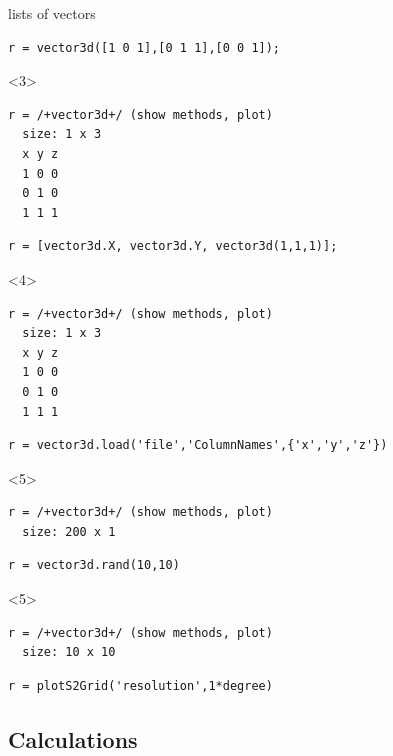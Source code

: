 \documentclass[compress]{beamer}
\begin{document}
\begin{frame}
\begin{overlayarea}{\textwidth}{8cm}
  lists of vectors
\begin{lstlisting}[style=input]
r = vector3d([1 0 1],[0 1 1],[0 0 1]);
\end{lstlisting}
\vspace{-.3cm}
\begin{onlyenv}<3>
\begin{lstlisting}[style=output]
r = /+vector3d+/ (show methods, plot)
  size: 1 x 3
  x y z
  1 0 0
  0 1 0
  1 1 1
\end{lstlisting}
\end{onlyenv}
\pause
\begin{lstlisting}[style=input]
r = [vector3d.X, vector3d.Y, vector3d(1,1,1)];
\end{lstlisting}
  \vspace{-.3cm}
\begin{onlyenv}<4>
\begin{lstlisting}[style=output]
r = /+vector3d+/ (show methods, plot)
  size: 1 x 3
  x y z
  1 0 0
  0 1 0
  1 1 1
\end{lstlisting}
\end{onlyenv}
\pause
\begin{lstlisting}[style=input]
r = vector3d.load('file','ColumnNames',{'x','y','z'})
\end{lstlisting}
  \vspace{-.3cm}
\begin{onlyenv}<5>
\begin{lstlisting}[style=output]
r = /+vector3d+/ (show methods, plot)
  size: 200 x 1
\end{lstlisting}
\end{onlyenv}
\pause
\begin{lstlisting}[style=input]
r = vector3d.rand(10,10)
\end{lstlisting}
  \vspace{-.3cm}
\begin{onlyenv}<5>
\begin{lstlisting}[style=output]
r = /+vector3d+/ (show methods, plot)
  size: 10 x 10
\end{lstlisting}
\end{onlyenv}
\pause
\begin{lstlisting}[style=input]
r = plotS2Grid('resolution',1*degree)
\end{lstlisting}
\end{overlayarea}
\end{frame}

\subsection*{Calculations}
\end{document}
